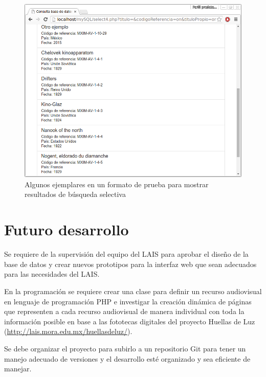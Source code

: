 \documentclass[10pt,letterpaper]{article}
\begin{document}
\begin{figure}[H]
	\centering
	\includegraphics[keepaspectratio=true,width=\linewidth]{Prototipo_03.png}
	\caption{Algunos ejemplares en un formato de prueba para mostrar resultados de búsqueda selectiva}
	\label{fig:prueba_formulario_2}
\end{figure}

\section{Futuro desarrollo}
Se requiere de la supervisión del equipo del LAIS para aprobar el diseño de la base de datos y crear nuevos prototipos para la interfaz web que sean adecuados para las necesidades del LAIS.

En la programación se requiere crear una clase para definir un recurso audiovisual en lenguaje de programación PHP e investigar la creación dinámica de páginas que representen a cada recurso audiovisual de manera individual con toda la información posible en base a las fototecas digitales del proyecto Huellas de Luz (\url{http://lais.mora.edu.mx/huellasdeluz/}).

Se debe organizar el proyecto para subirlo a un repositorio Git para tener un manejo adecuado de versiones y el desarrollo esté organizado y sea eficiente de manejar.
\end{document}
